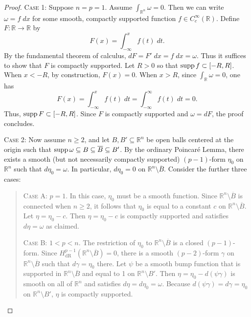 \documentclass{article}
\begin{document}
\begin{itemize}
\begin{proof}
			\textsc{Case 1:} Suppose $n = p = 1$. Assume $\int_{\mathbb{R}^{n}}\omega = 0$. Then we can write $\omega = f\;dx$ for some smooth, compactly supported function $f \in C_{c}^{\infty}(\mathbb{R})$. Define $F: \mathbb{R}\to\mathbb{R}$ by 
			\begin{equation*}
				F(x) =\int_{-\infty}^{x}f(t)\;dt. 
			\end{equation*}
			By the fundamental theorem of calculus, $dF = F'\;dx = f\;dx = \omega$. Thus it suffices to show that $F$ is compactly supported. Let $R > 0$ so that $\operatorname{supp}{f} \subset [-R, R]$. When $x < -R$, by construction, $F(x) = 0$. When $x > R$, since $\int_{\mathbb{R}}\omega = 0$, one has 
			\begin{equation*}
				F(x) = \int_{-\infty}^{x}f(t)\;dt = \int_{-\infty}^{\infty}f(t)\;dt= 0. 
			\end{equation*}
			Thus, $\operatorname{supp}{F} \subset [-R, R]$. Since $F$ is compactly supported and $\omega = dF$, the proof concludes. 
			
			\textsc{Case 2:} Now assume $n \geq 2$, and let $B, B' \subseteq \mathbb{R}^{n}$ be open balls centered at the origin such that $\operatorname{supp}{\omega} \subseteq B \subseteq \overline{B} \subseteq B'$. By the ordinary Poincar\'e Lemma, there exists a smooth (but not necessarily compactly supported) $(p-1)$-form $\eta_{0}$ on $\mathbb{R}^{n}$ such that $d\eta_{0} = \omega$. In particular, $d\eta_{0} = 0$ on $\mathbb{R}^{n}\setminus \overline{B}$. Consider the further three cases: 
			\begin{quote}
				\textsc{Case A:} $p = 1$. In this case, $\eta_{0}$ must be a smooth function. Since $\mathbb{R}^{n} \setminus \overline{B}$ is connected when $n \geq 2$, it follows that $\eta_{0}$ is equal to a constant $c$ on $\mathbb{R}^{n}\setminus \overline{B}$. Let $\eta = \eta_{0} - c$. Then $\eta = \eta_{0} - c$ is compactly supported and satisfies $d\eta = \omega$ as claimed.  
				
				\textsc{Case B:} $1 < p < n$. The restriction of $\eta_{0}$ to $\mathbb{R}^{n} \setminus \overline{B}$ is a closed $(p-1)$-form. Since $H^{p-1}_{\text{dR}}(\mathbb{R}^{n}\setminus \overline{B}) = 0$, there is a smooth $(p-2)$-form $\gamma$ on $\mathbb{R}^{n}\setminus \overline{B}$ such that $d\gamma = \eta_{0}$ there. Let $\psi$ be a smooth bump function that is supported in $\mathbb{R}^{n}\setminus \overline{B}$ and equal to 1 on $\mathbb{R}^{n}\setminus B'$. Then $\eta = \eta_{0} - d(\psi \gamma)$ is smooth on all of $\mathbb{R}^{n}$ and satisfies $d\eta = d\eta_{0} = \omega$. Because $d(\psi \gamma) = d\gamma = \eta_{0}$ on $\mathbb{R}^{n}\setminus B'$, $\eta$ is compactly supported. 
				

\end{quote}
\end{proof}
\end{itemize}
\end{document}
